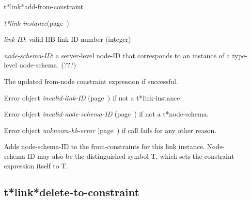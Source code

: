 \begin{description}
\item [Name:]  t*link*add-from-constraint

\item [Class:] {\sl t*link-instance}\hfill(page~\pageref{t*link-instance})

\item [Parameters:]
\item {\sl link-ID}:  
valid HB link ID number (integer)

\item {\sl node-schema-ID}:  a server-level node-ID that corresponds to an 
instance of a type-level node-schema. (???)



\item [Return-value:]
The updated from-node constraint expression if successful.

Error object {\sl invalid-link-ID} (page~\pageref{invalid-link-ID}) if not a t*link-instance.

Error object {\sl invalid-node-schema-ID} (page~\pageref{invalid-node-schema-ID}) if not
a t*node-schema.

Error object {\sl unknown-hb-error} (page~\pageref{unknown-hb-error}) if call fails for
any other reason.

\item [Description:]

Adds node-schema-ID to the from-constraints for this
link instance. Node-schema-ID may also be the distinguished
symbol T, which sets the constraint expression itself
to T.

\item [Public:]



\end{description}
\horizontalline

\subsection{t*link*delete-to-constraint}
\label{t*link*delete-to-constraint}

